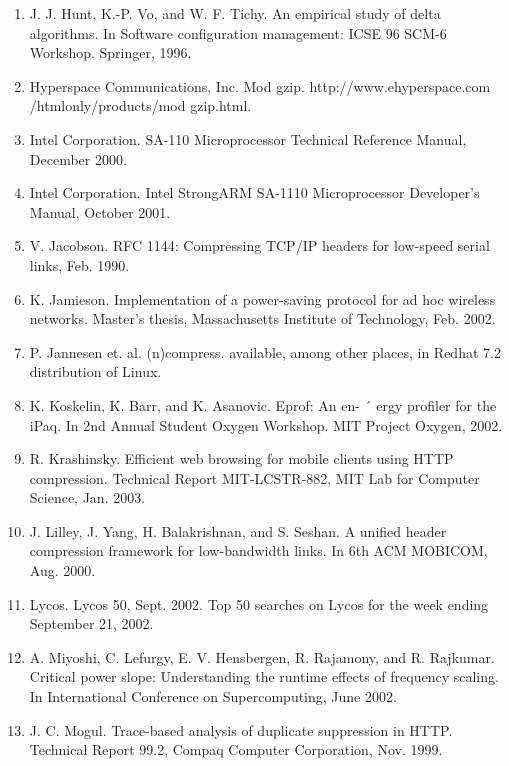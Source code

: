 \documentclass{article}
\begin{document}
\begin{enumerate}
	\item J. J. Hunt, K.-P. Vo, and W. F. Tichy. An empirical study
	of delta algorithms. In Software configuration management: ICSE 96 SCM-6 Workshop. Springer, 1996.

	\item Hyperspace Communications, Inc.
	Mod gzip. http://www.ehyperspace.com /htmlonly/products/mod gzip.html.

	\item Intel Corporation. SA-110 Microprocessor Technical Reference Manual, December 2000.


	\item Intel Corporation. Intel StrongARM SA-1110 Microprocessor Developer’s Manual, October 2001.

	\item V. Jacobson. RFC 1144: Compressing TCP/IP headers
	for low-speed serial links, Feb. 1990.

	\item K. Jamieson. Implementation of a power-saving protocol for ad hoc wireless networks. Master’s thesis, Massachusetts Institute of Technology, Feb. 2002.

	\item P. Jannesen et. al. (n)compress. available, among other
	places, in Redhat 7.2 distribution of Linux.

	\item K. Koskelin, K. Barr, and K. Asanovic. Eprof: An en- ´
	ergy profiler for the iPaq. In 2nd Annual Student Oxygen
	Workshop. MIT Project Oxygen, 2002.

	\item R. Krashinsky. Efficient web browsing for mobile clients
	using HTTP compression. Technical Report MIT-LCSTR-882, MIT Lab for Computer Science, Jan. 2003.

	\item J. Lilley, J. Yang, H. Balakrishnan, and S. Seshan. A unified header compression framework for low-bandwidth
	links. In 6th ACM MOBICOM, Aug. 2000.

	\item Lycos. Lycos 50, Sept. 2002. Top 50 searches on Lycos
	for the week ending September 21, 2002.

	\item A. Miyoshi, C. Lefurgy, E. V. Hensbergen, R. Rajamony,
	and R. Rajkumar. Critical power slope: Understanding
	the runtime effects of frequency scaling. In International
	Conference on Supercomputing, June 2002.

	\item J. C. Mogul. Trace-based analysis of duplicate suppression in HTTP. Technical Report 99.2, Compaq Computer
	Corporation, Nov. 1999.


\end{enumerate}
\end{document}
